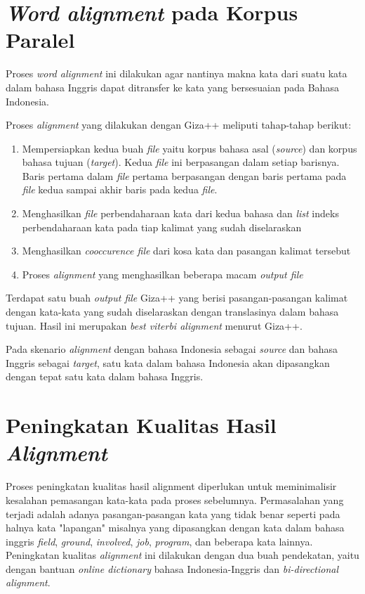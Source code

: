 \section{\textit{Word alignment} pada Korpus Paralel}
Proses \textit{word alignment} ini dilakukan agar nantinya makna kata dari suatu kata dalam bahasa Inggris dapat ditransfer ke kata yang bersesuaian pada Bahasa Indonesia.

Proses \textit{alignment} yang dilakukan dengan Giza++ meliputi tahap-tahap berikut:
\begin{enumerate}
	\item Mempersiapkan kedua buah \textit{file} yaitu korpus bahasa asal (\textit{source}) dan korpus bahasa tujuan (\textit{target}). Kedua \textit{file} ini berpasangan dalam setiap barisnya. Baris pertama dalam \textit{file} pertama berpasangan dengan baris pertama pada \textit{file} kedua sampai akhir baris pada kedua \textit{file}.
	\item Menghasilkan \textit{file} perbendaharaan kata dari kedua bahasa dan \textit{list} indeks perbendaharaan kata pada tiap kalimat yang sudah diselaraskan
	\item Menghasilkan \textit{cooccurence file} dari kosa kata dan pasangan kalimat tersebut
	\item Proses \textit{alignment} yang menghasilkan beberapa macam \textit{output file} 
\end{enumerate}

Terdapat satu buah \textit{output file} Giza++ yang berisi pasangan-pasangan kalimat dengan kata-kata yang sudah diselaraskan dengan translasinya dalam bahasa tujuan. Hasil ini merupakan \textit{best viterbi alignment} menurut Giza++.

Pada skenario \textit{alignment} dengan bahasa Indonesia sebagai \textit{source} dan bahasa Inggris sebagai \textit{target}, satu kata dalam bahasa Indonesia akan dipasangkan dengan tepat satu kata dalam bahasa Inggris.


\section{Peningkatan Kualitas Hasil \textit{Alignment}}
Proses peningkatan kualitas hasil alignment diperlukan untuk meminimalisir kesalahan pemasangan kata-kata pada proses sebelumnya. Permasalahan  yang terjadi adalah adanya pasangan-pasangan kata yang tidak benar seperti pada halnya kata "lapangan" misalnya yang  dipasangkan dengan kata dalam bahasa inggris \textit{field}, \textit{ground}, \textit{involved}, \textit{job}, \textit{program}, dan beberapa kata lainnya. Peningkatan kualitas \textit{alignment} ini dilakukan dengan dua buah pendekatan, yaitu dengan bantuan \textit{online dictionary} bahasa Indonesia-Inggris dan \textit{bi-directional alignment}. 

